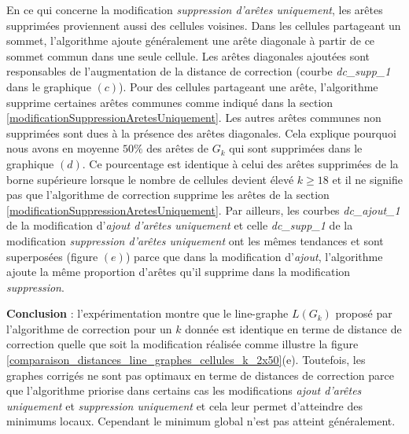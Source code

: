 \newline
En ce qui concerne la modification {\em suppression d'ar\^etes uniquement}, les ar\^etes supprim\'ees proviennent aussi des cellules voisines. 
Dans les cellules partageant un sommet, l'algorithme ajoute g\'en\'eralement une ar\^ete diagonale \`a partir de ce sommet commun dans une seule cellule. Les ar\^etes diagonales ajout\'ees sont responsables de l'augmentation de la distance de correction (courbe {\em dc\_supp\_1} dans le graphique $(c)$).
Pour des cellules partageant une ar\^ete, l'algorithme supprime certaines ar\^etes communes comme indiqu\'e dans la section \ref{modificationSuppressionAretesUniquement}. Les autres ar\^etes communes non supprim\'ees sont dues \`a la pr\'esence des ar\^etes diagonales. Cela explique pourquoi nous avons en moyenne $50\%$ des ar\^etes de $G_k$ qui sont supprim\'ees dans le graphique $(d)$. Ce pourcentage est identique \`a celui des ar\^etes supprim\'ees de la borne sup\'erieure lorsque le nombre de cellules devient \'elev\'e $k \ge 18$ et il ne signifie pas que l'algorithme de correction supprime les ar\^etes de la section \ref{modificationSuppressionAretesUniquement}.
\newline
Par ailleurs, les courbes {\em dc\_ajout\_1} de la modification d'{\em ajout d'ar\^etes uniquement} et celle {\em dc\_supp\_1}  de la modification {\em suppression d'ar\^etes uniquement} ont les m\^emes tendances et sont superpos\'ees (figure $(e)$) parce que  dans la modification d'{\em ajout}, l'algorithme ajoute la m\^eme proportion d'ar\^etes qu'il supprime dans  la modification {\em suppression}. 
\newline

\vspace{-0.25cm}
{\bf Conclusion} :   
l'exp\'erimentation montre que le line-graphe $L(G_k)$ propos\'e par l'algorithme de correction pour un $k$ donn\'ee est identique en terme de distance de correction quelle que soit la modification r\'ealis\'ee comme illustre la figure \ref{comparaison_distances_line_graphes_cellules_k_2x50}(e).
Toutefois, les graphes corrig\'es ne sont pas optimaux en terme de distances de correction parce que l'algorithme priorise dans certains cas les modifications {\em ajout d'ar\^etes uniquement} et {\em suppression uniquement} et cela leur permet d'atteindre des minimums locaux. Cependant le minimum global n'est pas atteint g\'en\'eralement. 

